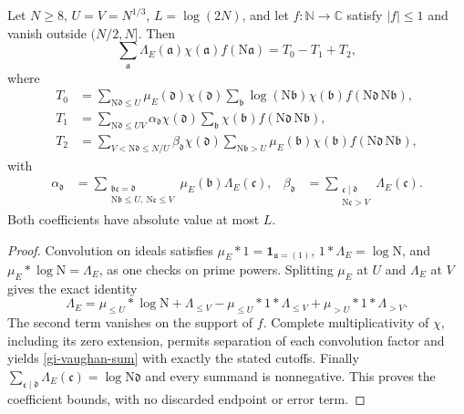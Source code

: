 \begin{lemma}\label{gi-vaughan}
Let $N\geq8$, $U=V=N^{1/3}$, $L=\log(2N)$, and let
$f:\mathbb N\longrightarrow\mathbb C$ satisfy $|f|\leq1$ and vanish
outside $(N/2,N]$.  Then
\begin{equation}\label{gi-vaughan-sum}
 \sum_{\mathfrak a}\Lambda_E(\mathfrak a)\chi(\mathfrak a)
                       f(\mathrm N\mathfrak a)=T_0-T_1+T_2,
\end{equation}
where
\begin{align*}
 T_0&=\sum_{\mathrm N\mathfrak d\leq U}\mu_E(\mathfrak d)\chi(\mathfrak d)
       \sum_{\mathfrak b}\log(\mathrm N\mathfrak b)\chi(\mathfrak b)
                  f(\mathrm N\mathfrak d\,\mathrm N\mathfrak b),\\
 T_1&=\sum_{\mathrm N\mathfrak d\leq UV}\alpha_{\mathfrak d}\chi(\mathfrak d)
       \sum_{\mathfrak b}\chi(\mathfrak b)
                  f(\mathrm N\mathfrak d\,\mathrm N\mathfrak b),\\
 T_2&=\sum_{V<\mathrm N\mathfrak d\leq N/U}\beta_{\mathfrak d}\chi(\mathfrak d)
       \sum_{\mathrm N\mathfrak b>U}\mu_E(\mathfrak b)\chi(\mathfrak b)
                  f(\mathrm N\mathfrak d\,\mathrm N\mathfrak b),
\end{align*}
with
\begin{align*}
 \alpha_{\mathfrak d}
   &=\sum_{\substack{\mathfrak b\mathfrak c=\mathfrak d\\
              \mathrm N\mathfrak b\leq U,\ \mathrm N\mathfrak c\leq V}}
                        \mu_E(\mathfrak b)\Lambda_E(\mathfrak c),&
 \beta_{\mathfrak d}
   &=\sum_{\substack{\mathfrak c\mid\mathfrak d\\\mathrm N\mathfrak c>V}}
                        \Lambda_E(\mathfrak c).
\end{align*}
Both coefficients have absolute value at most $L$.
\end{lemma}
\begin{proof}
Convolution on ideals satisfies
$\mu_E*1=\mathbf1_{\mathfrak a=(1)}$, $1*\Lambda_E=\log\mathrm N$,
and $\mu_E*\log\mathrm N=\Lambda_E$, as one checks on prime powers.
Splitting $\mu_E$ at $U$ and $\Lambda_E$ at $V$ gives the exact identity
\begin{equation}\label{gi-convolution-identity}
 \Lambda_E=\mu_{\leq U}*\log\mathrm N+\Lambda_{\leq V}
       -\mu_{\leq U}*1*\Lambda_{\leq V}
       +\mu_{>U}*1*\Lambda_{>V}.
\end{equation}
The second term vanishes on the support of $f$.  Complete multiplicativity
of $\chi$, including its zero extension, permits separation of each
convolution factor and yields \eqref{gi-vaughan-sum} with exactly the
stated cutoffs.  Finally
$\sum_{\mathfrak c\mid\mathfrak d}\Lambda_E(\mathfrak c)
=\log\mathrm N\mathfrak d$ and every summand is nonnegative.  This
proves the coefficient bounds, with no discarded endpoint or error term.
\end{proof}

